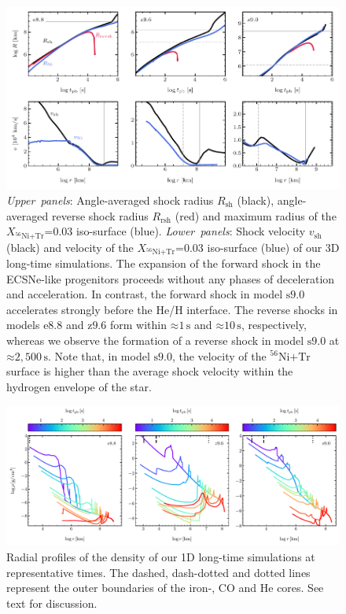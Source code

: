\documentclass[fleqn,usenatbib]{mnras}
\newcommand{\nickel}{\ensuremath{\mathrm{^{56}Ni}}\xspace}
\newcommand{\tracer}{\ensuremath{\mathrm{Tr}}\xspace}
\newcommand{\s}{\ensuremath{\text{s}}}
\newcommand{\onemg}{\ensuremath{\mathrm{e8.8}}\xspace}
\newcommand{\snine}{\ensuremath{\mathrm{s9.0}}\xspace}
\newcommand{\znine}{\ensuremath{\mathrm{z9.6}}\xspace}
\begin{document}
\begin{figure}
 \centering
 \includegraphics[width=\textwidth]{pic/radii_velocity_shock_nickel_paper.pdf}
 \caption{   
  \textit{Upper~panels}: Angle-averaged shock radius $R_{\mathrm{sh}}$ (black),
 angle-averaged reverse shock radius $R_{\mathrm{rsh}}$ (red) and maximum radius of the 
 $X_{\nickel\mathord{+}\tracer}\mathord{=}0.03$ iso-surface (blue). 
 \textit{Lower~panels}:
 Shock velocity $v_{\mathrm{sh}}$ (black) and velocity of the 
 $X_{\nickel\mathord{+}\tracer}\mathord{=}0.03$ iso-surface (blue) 
 of our 3D long-time simulations. 
 The expansion of the forward shock in the ECSNe-like progenitors proceeds without
 any phases of deceleration and acceleration. 
 In contrast, the forward shock in model \snine accelerates strongly before the He/H interface.
 The reverse shocks in models \onemg and \znine form within $\mathord{\approx}1\,\s$ and 
 $\mathord{\approx}10\,\s$, respectively, 
 whereas we observe the formation of a reverse shock in model \snine at
 $\mathord{\approx} 2,500\,\s$.
 Note that, in model \snine, the velocity of the $\nickel \mathord{+} \tracer$ 
 surface is higher than the average shock velocity within the hydrogen envelope of the star.
 }
 \label{fig:radii all times}
\end{figure}

\begin{figure}
 \centering
 \includegraphics[width=\textwidth, trim=0cm 0.0cm 0cm 0.0cm,clip]{pic/density_profiles_1d_long_term.pdf}
 \caption{Radial profiles of the density of our 1D long-time simulations at representative times. The dashed, dash-dotted and dotted lines represent the outer boundaries of the iron-, CO and He cores. See text for discussion.}
 \label{fig:density profiles all times}
\end{figure}
\end{document}
